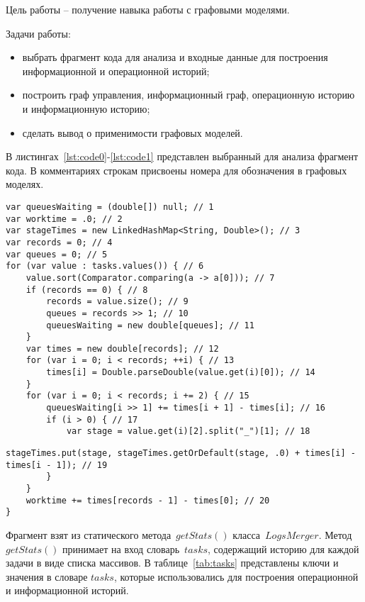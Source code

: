 

Цель работы -- получение навыка работы с графовыми моделями. 

Задачи работы: 
\begin{itemize}
	\item выбрать фрагмент кода для анализа и входные данные для построения информационной и операционной историй;
	\item построить граф управления, информационный граф, операционную историю и информационную историю;
	\item сделать вывод о применимости графовых моделей.
\end{itemize}


В листингах~\ref{lst:code0}-\ref{lst:code1} представлен выбранный для анализа фрагмент кода. В комментариях строкам присвоены номера для обозначения в графовых моделях.

\begin{lstlisting}[label=lst:code0,caption=Выбранный для анализа фрагмент кода~(начало)]
var queuesWaiting = (double[]) null; // 1
var worktime = .0; // 2
var stageTimes = new LinkedHashMap<String, Double>(); // 3
var records = 0; // 4
var queues = 0; // 5
for (var value : tasks.values()) { // 6
	value.sort(Comparator.comparing(a -> a[0])); // 7
	if (records == 0) { // 8
		records = value.size(); // 9
		queues = records >> 1; // 10
		queuesWaiting = new double[queues]; // 11
	}
	var times = new double[records]; // 12
	for (var i = 0; i < records; ++i) { // 13
		times[i] = Double.parseDouble(value.get(i)[0]); // 14
	}
	for (var i = 0; i < records; i += 2) { // 15
		queuesWaiting[i >> 1] += times[i + 1] - times[i]; // 16
		if (i > 0) { // 17
			var stage = value.get(i)[2].split("_")[1]; // 18
\end{lstlisting}
\clearpage
\begin{lstlisting}[label=lst:code1,caption=Выбранный для анализа фрагмент кода~(окончание)]	
			stageTimes.put(stage, stageTimes.getOrDefault(stage, .0) + times[i] - times[i - 1]); // 19
		}
	}
	worktime += times[records - 1] - times[0]; // 20
}
\end{lstlisting}

Фрагмент взят из статического метода~$getStats()$ класса~$LogsMerger$. Метод~$getStats()$ принимает на вход словарь~$tasks$, содержащий историю для каждой задачи в виде списка массивов. В таблице~\ref{tab:tasks} представлены ключи и значения в словаре $tasks$, которые использовались для построения операционной и информационной историй.

